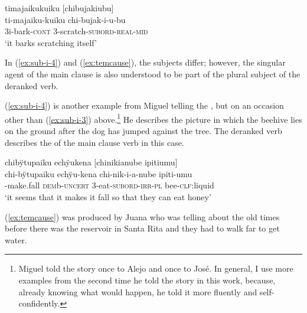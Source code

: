 \ea\label{ex:scratch-bark-1}
\begingl
\glpreamble timajaikukuiku \textup{[}chibujakiubu\textup{]}\\
\gla ti-majaiku-kuiku chi-bujak-i-u-bu\\
\glb 3i-bark-\textsc{cont} 3-scratch-\textsc{subord}-\textsc{real}-\textsc{mid}\\
\glft ‘it barks scratching itself’
\endgl
\trailingcitation{[jxx-p120430l-1.479]}
\xe


In (\ref{ex:sub-i-4}) and (\ref{ex:temcause}), the subjects differ; however, the singular agent of the main clause is also understood to be part of the plural subject of the deranked verb.

(\ref{ex:sub-i-4}) is another example from Miguel telling the , but on an occasion other than (\ref{ex:sub-i-3}) above.\footnote{Miguel told the story once to Alejo and once to José. In general, I use more examples from the second time he told the story in this work, because, already knowing what would happen, he told it more fluently and self-confidently.} He describes the picture in which the beehive lies on the ground after the dog has jumped against the tree. The deranked verb describes the  of the main clause verb in this case.

\ea\label{ex:sub-i-4}
\begingl 
\glpreamble chibÿtupaiku echÿukena \textup{[}chinikianube ipitiumu\textup{]}\\
\gla chi-bÿtupaiku echÿu-kena chi-nik-i-a-nube ipiti-umu\\ 
-make.fall \textsc{dem}b-\textsc{uncert} 3-eat-\textsc{subord}-\textsc{irr}-\textsc{pl} bee-\textsc{clf}:liquid\\ 
\glft ‘it seems that it makes it fall so that they can eat honey’\\ 
\endgl
\trailingcitation{[mtx-a110906l.093]}
\xe

(\ref{ex:temcause}) was produced by Juana who was telling about the old times before there was the reservoir in Santa Rita and they had to walk far to get water.

